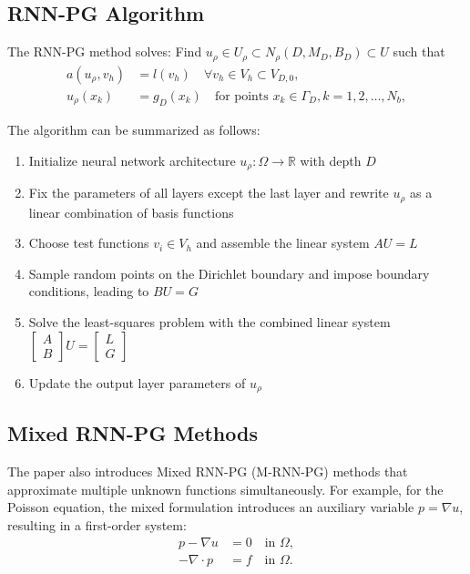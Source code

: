 \documentclass[11pt,a4paper]{article}
\begin{document}
\subsection{RNN-PG Algorithm}

The RNN-PG method solves: Find $u_\rho \in U_\rho \subset N_\rho(D, M_D, B_D) \subset U$ such that
\begin{align}
a(u_\rho, v_h) &= l(v_h) \quad \forall v_h \in V_h \subset V_{D,0}, \\
u_\rho(x_k) &= g_D(x_k) \quad \text{for points } x_k \in \Gamma_D, k = 1, 2, \ldots, N_b,
\end{align}

The algorithm can be summarized as follows:

\begin{enumerate}
    \item Initialize neural network architecture $u_\rho: \Omega \rightarrow \mathbb{R}$ with depth $D$
    \item Fix the parameters of all layers except the last layer and rewrite $u_\rho$ as a linear combination of basis functions
    \item Choose test functions $v_i \in V_h$ and assemble the linear system $AU = L$
    \item Sample random points on the Dirichlet boundary and impose boundary conditions, leading to $BU = G$
    \item Solve the least-squares problem with the combined linear system $\begin{bmatrix} A \\ B \end{bmatrix} U = \begin{bmatrix} L \\ G \end{bmatrix}$
    \item Update the output layer parameters of $u_\rho$
\end{enumerate}

\subsection{Mixed RNN-PG Methods}

The paper also introduces Mixed RNN-PG (M-RNN-PG) methods that approximate multiple unknown functions simultaneously. For example, for the Poisson equation, the mixed formulation introduces an auxiliary variable $p = \nabla u$, resulting in a first-order system:
\begin{align}
p - \nabla u &= 0 \quad \text{in } \Omega, \\
-\nabla \cdot p &= f \quad \text{in } \Omega.
\end{align}
\end{document}
